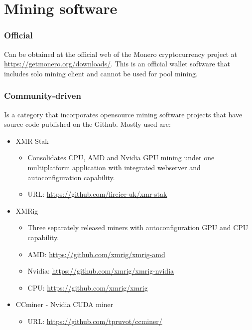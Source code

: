 \documentclass[
  printed, %
  table,   %
  nolof,     %
  nolot,     %
           oneside, color
]{fithesis3}
\begin{document}
\section{Mining software}
\subsubsection{Official}
Can be obtained at the official web of the Monero cryptocurrency project at \url{https://getmonero.org/downloads/}. This is an official wallet software that includes solo mining client and cannot be used for pool mining.

\subsubsection{Community-driven}
Is a category that incorporates opensource mining software projects that have source code published on the Github. Mostly used are:

\begin{itemize}\itemsep0em
\item XMR Stak 
\begin{itemize}\itemsep0em \item Consolidates CPU, AMD and Nvidia GPU mining under one multiplatform application with integrated webserver and autoconfiguration capability. \item URL: \url{https://github.com/fireice-uk/xmr-stak} \end{itemize}
\setlength\itemsep{1em}
\item XMRig 
\setlength\itemsep{0em}
\begin{itemize}\itemsep0em \item Three separately released miners with autoconfiguration GPU and CPU capability. \item AMD: \url{https://github.com/xmrig/xmrig-amd} 
 \item Nvidia: \url{https://github.com/xmrig/xmrig-nvidia} \item CPU: \url{https://github.com/xmrig/xmrig} \end{itemize}
\item CCminer - Nvidia CUDA miner
\begin{itemize}\itemsep0em \item URL: \url{https://github.com/tpruvot/ccminer/} \end{itemize}
\end{itemize}
\end{document}
